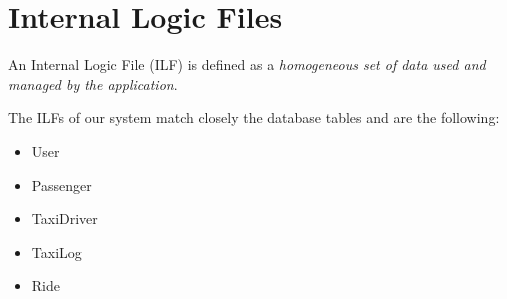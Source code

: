 \section{Internal Logic Files}
An Internal Logic File (ILF) is defined as a \emph{homogeneous set of data used
and managed by the application}.

The ILFs of our system match closely the database tables and are the following:
\begin{itemize}
	\item User
	\item Passenger
	\item TaxiDriver
	\item TaxiLog
	\item Ride
\end{itemize}
